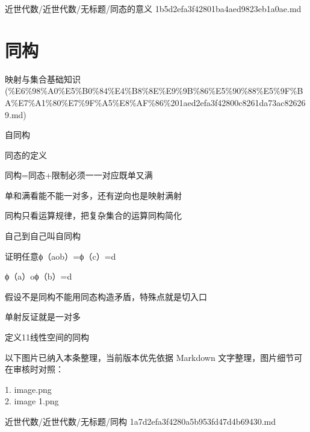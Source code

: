 \begin{note}[来源路径]

近世代数/近世代数/无标题/同态的意义 1b5d2efa3f42801ba4aed9823eb1a0ae.md

\end{note}

\section*{同构}

\begin{note}[来源上级主题]

映射与集合基础知识 (\%E6\%98\%A0\%E5\%B0\%84\%E4\%B8\%8E\%E9\%9B\%86\%E5\%90\%88\%E5\%9F\%BA\%E7\%A1\%80\%E7\%9F\%A5\%E8\%AF\%86\%201aed2efa3f42800c8261da73ac826269.md)

\end{note}

\begin{note}[同构]

自同构

同态的定义

同构=同态+限制必须一一对应既单又满

单和满看能不能一对多，还有逆向也是映射满射

同构只看运算规律，把复杂集合的运算同构简化

自己到自己叫自同构

证明任意ϕ（aob）=ϕ（c）=d

ϕ（a）oϕ（b）=d

假设不是同构不能用同态构造矛盾，特殊点就是切入口

单射反证就是一对多

定义11线性空间的同构

\end{note}

\begin{note}[关联图片]
以下图片已纳入本条整理，当前版本优先依据 Markdown 文字整理，图片细节可在审核时对照：

1. image.png\\
2. image 1.png\\

\end{note}

\begin{note}[来源路径]

近世代数/近世代数/无标题/同构 1a7d2efa3f4280a5b953fd47d4b69430.md

\end{note}

